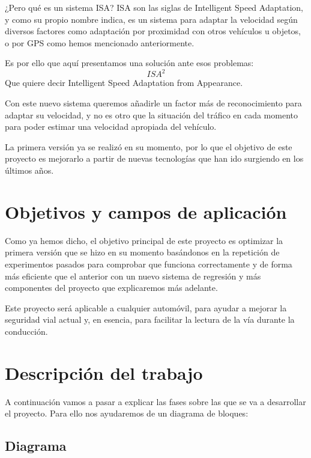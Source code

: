 \documentclass[12pt,oneside,a4paper]{article}
\begin{document}
¿Pero qué es un sistema ISA? ISA son las siglas de Intelligent Speed Adaptation, y como su propio nombre indica, es un sistema para adaptar la velocidad según diversos factores como adaptación por proximidad con otros vehículos u objetos, o por GPS como hemos mencionado anteriormente.

Es por ello que aquí presentamos una solución ante esos problemas: \[ISA^{2}\]
Que quiere decir Intelligent Speed Adaptation from Appearance.

Con este nuevo sistema queremos añadirle un factor más de reconocimiento para adaptar su velocidad, y no es otro que la situación del tráfico en cada momento para poder estimar una velocidad apropiada del vehículo.

La primera versión ya se realizó en su momento, por lo que el objetivo de este proyecto es mejorarlo a partir de nuevas tecnologías que han ido surgiendo en los últimos años.

\section{Objetivos y campos de aplicación}

Como ya hemos dicho, el objetivo principal de este proyecto es optimizar la primera versión que se hizo en su momento basándonos en la repetición de experimentos pasados para comprobar que funciona correctamente y de forma más eficiente que el anterior con un nuevo sistema de regresión y más componentes del proyecto que explicaremos más adelante.

Este proyecto será aplicable a cualquier automóvil, para ayudar a mejorar la seguridad vial actual y, en esencia, para facilitar la lectura de la vía durante la conducción.

\section{Descripción del trabajo}

A continuación vamos a pasar a explicar las fases sobre las que se va a desarrollar el proyecto. Para ello nos ayudaremos de un diagrama de bloques:

\subsection{Diagrama}
\begin{center}

\end{center}
\end{document}
